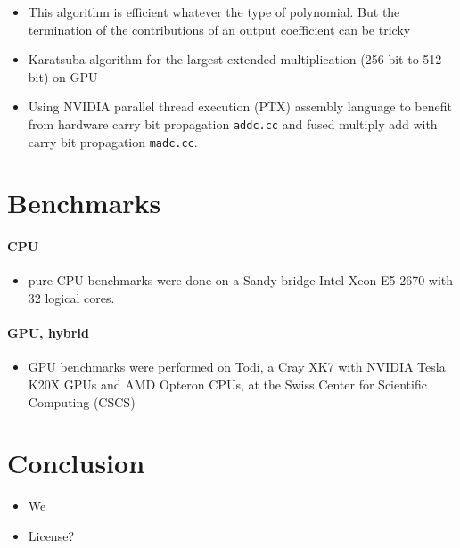 \documentclass[oribibl]{llncs2e/llncs}
\begin{document}
\begin{itemize}
\item {\color{blue} This algorithm is efficient whatever the type of polynomial. But the termination of the contributions of an output coefficient can be tricky}
\item {\color{blue}  Karatsuba algorithm \cite{Karatsuba1963} for the largest extended multiplication (256 bit to 512 bit) on GPU}
\item Using NVIDIA parallel thread execution (PTX) assembly language to benefit from hardware carry bit propagation \verb|addc.cc| and fused multiply add with carry bit propagation \verb|madc.cc|.
\end{itemize}

\section{Benchmarks}
\paragraph{CPU}
\begin{itemize}
\item pure CPU benchmarks were done on a Sandy bridge Intel Xeon E5-2670 with 32 logical cores.
\end{itemize}
\paragraph{GPU, hybrid}
\begin{itemize}
\item GPU benchmarks were performed on Todi, a Cray XK7 with NVIDIA Tesla K20X GPUs and AMD Opteron CPUs, at the Swiss Center for Scientific Computing (CSCS)
\end{itemize}


\section{Conclusion}
\begin{itemize}
\item We 
\item License?
\end{itemize}



\end{document}
